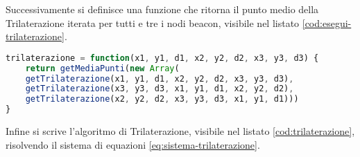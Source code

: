 Successivamente si definisce una funzione che ritorna il punto medio della Trilaterazione iterata per tutti e tre i nodi beacon, visibile nel listato \ref{cod:esegui-trilaterazione}.

\begin{lstlisting}[language=JavaScript, label=cod:esegui-trilaterazione, caption=Calcolo del punto medio della Trilaterazione iterata per i tre nodi beacon]
trilaterazione = function(x1, y1, d1, x2, y2, d2, x3, y3, d3) {
	return getMediaPunti(new Array(
	getTrilaterazione(x1, y1, d1, x2, y2, d2, x3, y3, d3),
	getTrilaterazione(x3, y3, d3, x1, y1, d1, x2, y2, d2),
	getTrilaterazione(x2, y2, d2, x3, y3, d3, x1, y1, d1)))
}
\end{lstlisting}


Infine si scrive l'algoritmo di Trilaterazione, visibile nel listato \ref{cod:trilaterazione}, risolvendo il sistema di equazioni \ref{eq:sistema-trilaterazione}.


